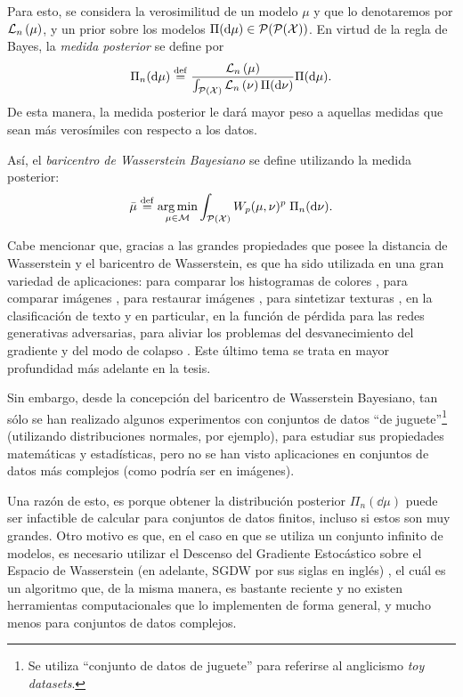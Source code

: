 Para esto, se considera la verosimilitud de un modelo $\mu$ y que lo denotaremos por $\LikelihoodN[\mu]$, y un prior sobre los modelos $\Pi(\dd \mu) \in \ProbSpace[\ProbSpace[\cX]]$. En virtud de la regla de Bayes, la \emph{medida posterior} se define por
\begin{equation}
	\Pi_n(\dd \mu) \eqdef \frac{\LikelihoodN[\mu]}{\int_{\ProbSpace[\cX]} \LikelihoodN[\nu] \Pi(\dd \nu)} \Pi(\dd \mu).
\end{equation}
De esta manera, la medida posterior le dará mayor peso a aquellas medidas que sean más verosímiles con respecto a los datos.

Así, el \emph{baricentro de Wasserstein Bayesiano} se define utilizando la medida posterior:
\begin{equation}
	\bar\mu \eqdef \argmin_{\mu \in \Models} \int_{\ProbSpace[\cX]} \Wasserstein[p]{\mu}{\nu}^p \; {\Pi_n(\dd \nu)}.
\end{equation}


Cabe mencionar que, gracias a las grandes propiedades que posee la distancia de Wasserstein y el baricentro de Wasserstein, es que ha sido utilizada en una gran variedad de aplicaciones:
para comparar los histogramas de colores \cite{rubner1998metric}, para comparar imágenes \cite{peleg1989unified}, para restaurar imágenes \cite{lellmann2014imaging}, para sintetizar texturas \cite{tartavel2016wasserstein}, en la clasificación de texto \cite{kusner2015word} y en particular,
en la función de pérdida para las redes generativas adversarias, para aliviar los problemas del desvanecimiento del gradiente y del modo de colapso \cite{arjovsky2017wasserstein}. Este último tema se trata en mayor profundidad más adelante en la tesis.

Sin embargo, desde la concepción del baricentro de Wasserstein Bayesiano, tan sólo se han realizado algunos experimentos con conjuntos de datos ``de juguete''\footnote{Se utiliza ``conjunto de datos de juguete'' para referirse al anglicismo \textit{toy datasets}.} (utilizando distribuciones normales, por ejemplo), para estudiar sus propiedades matemáticas y estadísticas, pero no se han visto aplicaciones en conjuntos de datos más complejos (como podría ser en imágenes).


Una razón de esto, es porque obtener la distribución posterior $\Pi_n(\dd \mu)$ puede ser infactible de calcular para conjuntos de datos finitos, incluso si estos son muy grandes. Otro motivo es que, en el caso en que se utiliza un conjunto infinito de modelos, es necesario utilizar el Descenso del Gradiente Estocástico sobre el Espacio de Wasserstein (en adelante, SGDW por sus siglas en inglés) \cite{backhoff2022stochastic}, el cuál es un algoritmo que, de la misma manera, es bastante reciente y no existen herramientas computacionales que lo implementen de forma general, y mucho menos para conjuntos de datos complejos.

